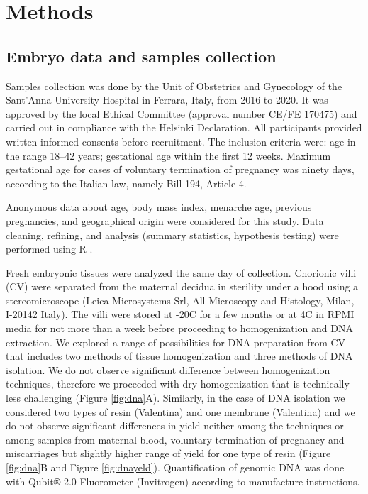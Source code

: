 \section*{Methods}

\subsection*{Embryo data and samples collection}
Samples collection was done by the Unit of Obstetrics and Gynecology of the Sant’Anna University Hospital in Ferrara, Italy, from 2016 to 2020. It was approved by the local Ethical Committee (approval number CE/FE 170475) and carried out in compliance with the Helsinki Declaration. All participants provided written informed consents before recruitment. The inclusion criteria were: age in the range 18–42 years; gestational age within the first 12 weeks. Maximum gestational age for cases of voluntary termination of pregnancy was ninety days, according to the Italian law, namely Bill 194, Article 4. 

Anonymous data about age, body mass index, menarche age, previous pregnancies, and geographical origin were considered for this study. Data cleaning, refining, and analysis (summary statistics, hypothesis testing) were performed using R \cite{R}.

Fresh embryonic tissues were analyzed the same day of collection. Chorionic villi (CV) were separated from the maternal decidua in sterility under a hood using a stereomicroscope (Leica Microsystems Srl, All Microscopy and Histology, Milan, I-20142 Italy). The villi were stored at -20\textdegree  C for a few months or at 4\textdegree  C in RPMI media for not more than a week before proceeding to homogenization and DNA extraction. We explored a range of possibilities for DNA preparation from CV that includes two methods of tissue homogenization and three methods of DNA isolation. We do not observe significant difference between homogenization techniques, therefore we proceeded with dry homogenization that is technically less challenging (Figure \ref{fig:dna}A). Similarly, in the case of DNA isolation we considered two types of resin (Valentina) and one membrane (Valentina) and we do not observe significant differences in yield neither among the techniques or among samples from maternal blood, voluntary termination of pregnancy and miscarriages but slightly higher range of yield for one type of resin (Figure \ref{fig:dna}B and Figure \ref{fig:dnayeld}). Quantification of genomic DNA was done with Qubit® 2.0 Fluorometer (Invitrogen) according to manufacture instructions.

